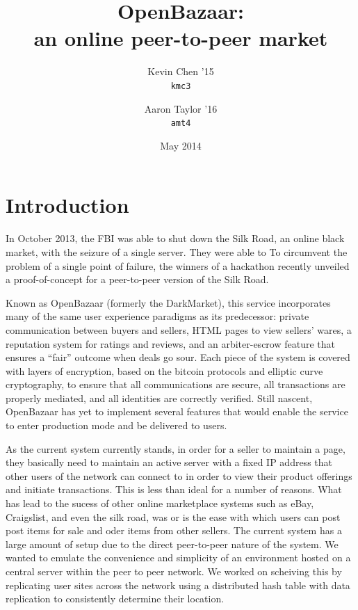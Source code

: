 \documentclass[12pt,twocolumn]{article}
\title{\bf \sc OpenBazaar: \\ an online peer-to-peer market}
\author{
    {\rm Kevin Chen '15} \\
    {\tt kmc3}
    \and 
    {\rm Aaron Taylor '16} \\
    {\tt amt4}
}
\date{May 2014}
\begin{document}
\maketitle

\doublespacing



\section{Introduction}
In October 2013, the FBI was able to shut down the Silk Road, an online black market, with the seizure of a single server. They were able to 
To circumvent the problem of a single point of failure, the winners of a hackathon recently unveiled a proof-of-concept for a peer-to-peer version of the Silk Road.

Known as OpenBazaar (formerly the DarkMarket), this service incorporates many of the same user experience paradigms as its predecessor: private communication between buyers and sellers, HTML pages to view sellers' wares, a reputation system for ratings and reviews, and an arbiter-escrow feature that ensures a ``fair'' outcome when deals go sour. Each piece of the system is covered with layers of encryption, based on the bitcoin protocols and elliptic curve cryptography, to ensure that all communications are secure, all transactions are properly mediated, and all identities are correctly verified.
Still nascent, OpenBazaar has yet to implement several features that would enable the service to enter production mode and be delivered to users.

As the current system currently stands, in order for a seller to maintain a page, they basically need to maintain an active server with a fixed IP address that other users of the network can connect to in order to view their product offerings and initiate transactions. This is less than ideal for a number of reasons. What has lead to the sucess of other online marketplace systems such as eBay, Craigslist, and even the silk road, was or is the ease with which users can post post items for sale and oder items from other sellers. The current system has a large amount of setup due to the direct peer-to-peer nature of the system. We wanted to emulate the convenience and simplicity of an environment hosted on a central server within the peer to peer network. We worked on scheiving this by replicating user sites across the network using a distributed hash table with data replication to consistently determine their location.
\end{document}
